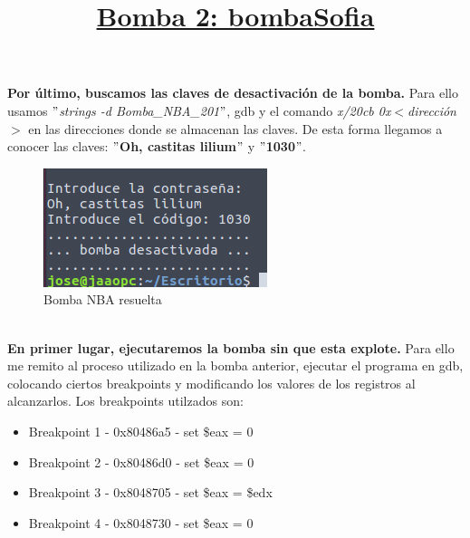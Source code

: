 \documentclass[11pt,a4paper]{article}
\begin{document}
\textbf{Por último, buscamos las claves de desactivación de la bomba.} Para ello usamos \emph{$"$strings -d Bomba\_NBA\_201$"$}, gdb y el comando \emph{x/20cb 0x$<$dirección$>$} en las direcciones donde se almacenan las claves. De esta forma llegamos a conocer las claves: \textbf{$"$Oh, castitas lilium$"$} y \textbf{$"$1030$"$}. \\


\begin{figure}[H] 
	\centering
	\includegraphics[scale=0.45]{capturas/nbaFIN.png} 
	\caption{Bomba NBA resuelta} \label{fig:figura25}
\end{figure}

\title{\large{\textbf{\underline{Bomba 2: bombaSofia}}}} \\

\textbf{En primer lugar, ejecutaremos la bomba sin que esta explote.} Para ello me remito al proceso utilizado en la bomba anterior, ejecutar el programa en gdb, colocando ciertos breakpoints y modificando los valores de los registros al alcanzarlos. Los breakpoints utilzados son:

\begin{itemize}
	\item Breakpoint 1 - 0x80486a5 - set \$eax = 0
	\item Breakpoint 2 - 0x80486d0 - set \$eax = 0
	\item Breakpoint 3 - 0x8048705 - set \$eax = \$edx
	\item Breakpoint 4 - 0x8048730 - set \$eax = 0
\end{itemize}
\end{document}
